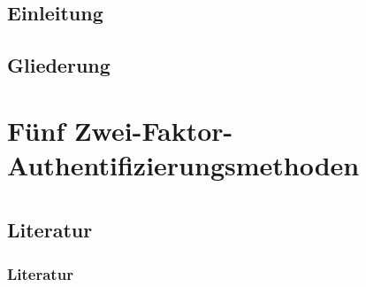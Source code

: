 \subsection{Einleitung}


\subsection{Gliederung}

%
%

\section{Fünf Zwei-Faktor-Authentifizierungsmethoden}


\tucthreeheadlines{}
\section{}




\tuctwoheadlines{}
\section*{\ShortTitle}
\subsection{Literatur}
% 
\begin{frame}
\frametitle{Literatur}


\end{frame}


